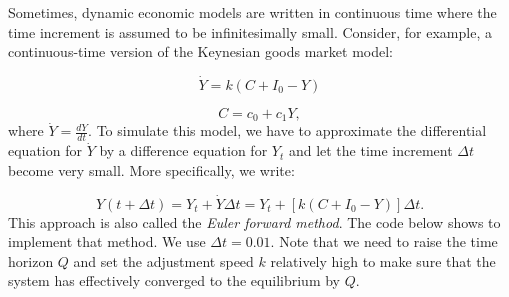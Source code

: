\documentclass[
  letterpaper,
  DIV=11,
  numbers=noendperiod]{scrreprt}
\begin{document}
Sometimes, dynamic economic models are written in continuous time where
the time increment is assumed to be infinitesimally small. Consider, for
example, a continuous-time version of the Keynesian goods market model:

\[
\dot{Y}= k(C + I_0 - Y)
\]

\[
C = c_0 + c_1Y,
\] where \(\dot{Y}=\frac{dY}{dt}\). To simulate this model, we have to
approximate the differential equation for \(\dot{Y}\) by a difference
equation for \(Y_t\) and let the time increment \(\Delta t\) become very
small. More specifically, we write:

\[
Y(t+\Delta t)=Y_t + \dot{Y} \Delta t =Y_t + [k(C + I_0 - Y)]\Delta t.
\] This approach is also called the \emph{Euler forward method}. The
code below shows to implement that method. We use \(\Delta t = 0.01\).
Note that we need to raise the time horizon \(Q\) and set the adjustment
speed \(k\) relatively high to make sure that the system has effectively
converged to the equilibrium by \(Q\).
\end{document}
